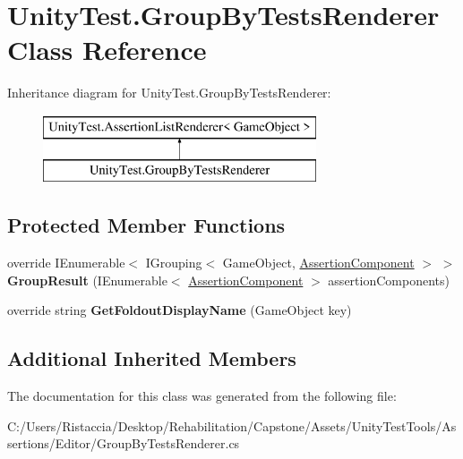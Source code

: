 \hypertarget{class_unity_test_1_1_group_by_tests_renderer}{}\section{Unity\+Test.\+Group\+By\+Tests\+Renderer Class Reference}
\label{class_unity_test_1_1_group_by_tests_renderer}
Inheritance diagram for Unity\+Test.\+Group\+By\+Tests\+Renderer\+:\begin{figure}[H]
\begin{center}
\leavevmode
\includegraphics[height=2.000000cm]{class_unity_test_1_1_group_by_tests_renderer}
\end{center}
\end{figure}
\subsection*{Protected Member Functions}
\begin{DoxyCompactItemize}
\item 
\mbox{\label{class_unity_test_1_1_group_by_tests_renderer_ab935471aec3a795da3da9b3dc6bf1aad}} 
override I\+Enumerable$<$ I\+Grouping$<$ Game\+Object, \hyperlink{class_unity_test_1_1_assertion_component}{Assertion\+Component} $>$ $>$ {\bfseries Group\+Result} (I\+Enumerable$<$ \hyperlink{class_unity_test_1_1_assertion_component}{Assertion\+Component} $>$ assertion\+Components)
\item 
\mbox{\label{class_unity_test_1_1_group_by_tests_renderer_acd8b32f097ef3ef2d0dc50ca8a863d8f}} 
override string {\bfseries Get\+Foldout\+Display\+Name} (Game\+Object key)
\end{DoxyCompactItemize}
\subsection*{Additional Inherited Members}


The documentation for this class was generated from the following file\+:\begin{DoxyCompactItemize}
\item 
C\+:/\+Users/\+Ristaccia/\+Desktop/\+Rehabilitation/\+Capstone/\+Assets/\+Unity\+Test\+Tools/\+Assertions/\+Editor/Group\+By\+Tests\+Renderer.\+cs\end{DoxyCompactItemize}
